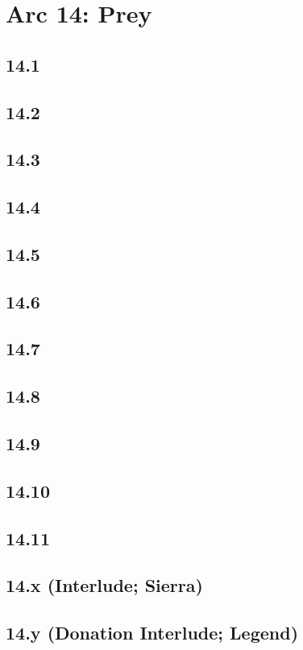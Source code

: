 \part*{Arc 14: Prey}
 \chapter*{14.1}
 \chapter*{14.2}
 \chapter*{14.3}
 \chapter*{14.4}
 \chapter*{14.5}
 \chapter*{14.6}
 \chapter*{14.7}
 \chapter*{14.8}
 \chapter*{14.9}
 \chapter*{14.10}
 \chapter*{14.11}
 \chapter*{14.x (Interlude; Sierra)}
 \chapter*{14.y (Donation Interlude; Legend)}














